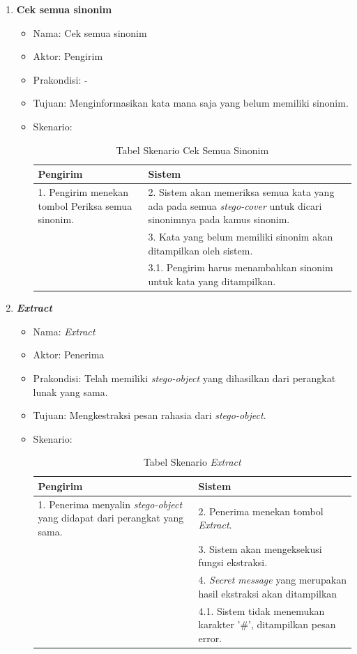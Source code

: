 \begin{enumerate}
	\item \textbf{Cek semua sinonim}
	\begin{itemize}
		\item Nama: Cek semua sinonim
		\item Aktor: Pengirim
		\item Prakondisi: -
		\item Tujuan: Menginformasikan kata mana saja yang belum memiliki sinonim.
		\item Skenario:
		\begin{table}[H]
		\centering
		\caption{Tabel Skenario Cek Semua Sinonim}
		\begin{tabular}{| p{6.5cm} | p{6.5cm} |}\hline
		Pengirim & Sistem \\
		\hline
				1. Pengirim menekan tombol Periksa semua sinonim. & 2. Sistem akan memeriksa semua kata yang ada pada semua \textit{stego-cover} untuk dicari sinonimnya pada kamus sinonim. \\
				\hline
				& 3. Kata yang belum memiliki sinonim akan ditampilkan oleh sistem. \\
				& 3.1. Pengirim harus menambahkan sinonim untuk kata yang ditampilkan.\\
		\hline
		\end{tabular}
		\end{table}
	\end{itemize}
	
	\item \textbf{\textit{Extract}}
	\begin{itemize}
		\item Nama: \textit{Extract}
		\item Aktor: Penerima
		\item Prakondisi: Telah memiliki \textit{stego-object} yang dihasilkan dari perangkat lunak yang sama.
		\item Tujuan: Mengkestraksi pesan rahasia dari \textit{stego-object}.
		\item Skenario:
		\begin{table}[H]
		\centering
		\caption{Tabel Skenario \textit{Extract}}
		\begin{tabular}{| p{6.5cm} | p{6.5cm} |}\hline
		Pengirim & Sistem \\
		\hline
				1. Penerima menyalin \textit{stego-object} yang didapat dari perangkat yang sama. & 2. Penerima menekan tombol \textit{Extract}. \\
				\hline
				& 3. Sistem akan mengeksekusi fungsi ekstraksi. \\
				\hline
				& 4. \textit{Secret message} yang merupakan hasil ekstraksi akan ditampilkan\\
				& 4.1. Sistem tidak menemukan karakter '\#', ditampilkan pesan error. \\
		\hline
		\end{tabular}
		\end{table}
	\end{itemize}
	

\end{enumerate}
